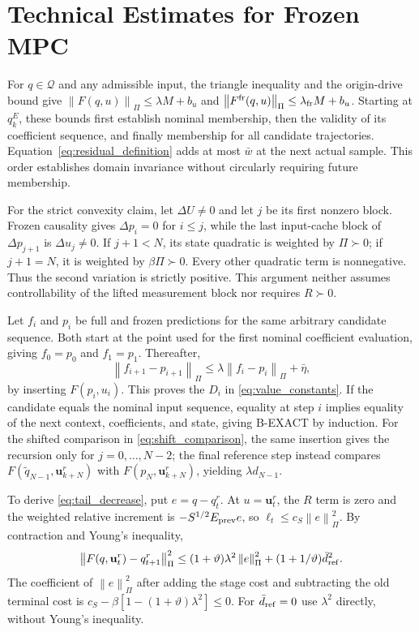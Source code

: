 \documentclass[journal]{IEEEtran}
\newcommand{\vu}{\mathbf{u}}
\newcommand{\norm}[1]{\left\lVert #1\right\rVert}
\begin{document}
\section{Technical Estimates for Frozen MPC}
\label{app:estimates}
For $q\in\mathcal Q$ and any admissible input, the triangle inequality and the origin-drive bound give $\norm{F(q,u)}_\Pi\le\lambda M+b_u$ and $\norm{F^{\rm fr}(q,u)}_\Pi\le\lambda_{\rm fr}M+b_u$. Starting at $q_k^E$, these bounds first establish nominal membership, then the validity of its coefficient sequence, and finally membership for all candidate trajectories. Equation~\eqref{eq:residual_definition} adds at most $\bar w$ at the next actual sample. This order establishes domain invariance without circularly requiring future membership.

For the strict convexity claim, let $\Delta U\ne0$ and let $j$ be its first nonzero block. Frozen causality gives $\Delta p_i=0$ for $i\le j$, while the last input-cache block of $\Delta p_{j+1}$ is $\Delta u_j\ne0$. If $j+1<N$, its state quadratic is weighted by $\Pi\succ0$; if $j+1=N$, it is weighted by $\beta\Pi\succ0$. Every other quadratic term is nonnegative. Thus the second variation is strictly positive. This argument neither assumes controllability of the lifted measurement block nor requires $R\succ0$.

Let $f_i$ and $p_i$ be full and frozen predictions for the same arbitrary candidate sequence. Both start at the point used for the first nominal coefficient evaluation, giving $f_0=p_0$ and $f_1=p_1$. Thereafter,
\begin{equation*}
\norm{f_{i+1}-p_{i+1}}_\Pi\le
\lambda\norm{f_i-p_i}_\Pi+\bar\eta,
\end{equation*}
by inserting $F(p_i,u_i)$. This proves the $D_i$ in \eqref{eq:value_constants}. If the candidate equals the nominal input sequence, equality at step $i$ implies equality of the next context, coefficients, and state, giving B-EXACT by induction. For the shifted comparison in \eqref{eq:shift_comparison}, the same insertion gives the recursion only for $j=0,\ldots,N-2$; the final reference step instead compares $F(\widetilde q_{N-1},\vu_{k+N}^r)$ with $F(p_N,\vu_{k+N}^r)$, yielding $\lambda d_{N-1}$.

To derive \eqref{eq:tail_decrease}, put $e=q-q_t^r$. At $u=\vu_t^r$, the $R$ term is zero and the weighted relative increment is $-S^{1/2}E_{\rm prev}e$, so $\ell_t\le c_S\norm{e}_\Pi^2$. By contraction and Young's inequality,
\begin{equation*}
\norm{F(q,\vu_t^r)-q_{t+1}^r}_\Pi^2
\le(1+\vartheta)\lambda^2\norm{e}_\Pi^2
+(1+1/\vartheta)\bar d_{\rm ref}^2.
\end{equation*}
The coefficient of $\norm{e}_\Pi^2$ after adding the stage cost and subtracting the old terminal cost is $c_S-\beta[1-(1+\vartheta)\lambda^2]\le0$. For $\bar d_{\rm ref}=0$ use $\lambda^2$ directly, without Young's inequality.
\end{document}
